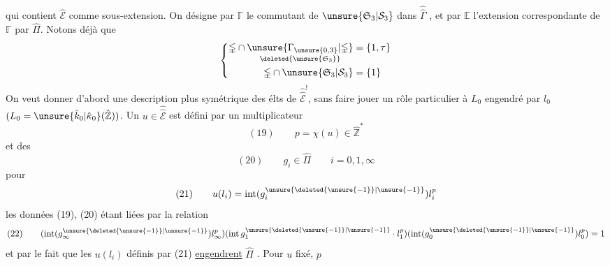 qui contient $\hat{\mathcal E}$ comme sous-extension. On désigne par $\mathbb\Gamma$ le commutant de $\unsure{\mathfrak S_3|\mathcal S_3}$ dans $\widehat{\widehat\Gamma}$ , et par $\mathbb E$ l'extension correspondante de $\mathbb\Gamma$ par $\hat\Pi$. Notons déjà que
\[
\left\{\begin{aligned}
\mathbb\Gamma\cap\underset{\deleted{\unsure{\mathfrak S_3}}}{\unsure{\Gamma_{\unsure{0,3}}|\mathbb\Gamma}}&=\{1,\tau\}\\
\mathbb\Gamma\cap\unsure{\mathfrak S_3|\mathcal S_3}&=\{1\}
\end{aligned}\right.
\]
On veut donner d'abord une description plus symétrique des élts de $\widehat{\widehat{\mathcal E}}^!$, sans faire jouer un rôle particulier à $L_0$ engendré par $l_0$ $(L_0=\unsure{\hat k_0|\hat\kappa_0}(\hat{\mathbb Z}))$. Un $u\in\widehat{\widehat{\mathcal E}}$ est  défini par un multiplicateur
\[
(19)\qquad p=\chi(u)\in\hat{\mathbb Z}^{*}
\]
et des
\[
(20)\qquad g_i\in\hat\Pi\qquad i=0,1,\infty
\]
pour
\[
(21)\qquad u(l_i)=\operatorname{int}(g_i^{\unsure{\deleted{\unsure{-1}}|\unsure{-1}}})l_i^p
\]
les données (19), (20) étant liées par la relation
\[
(22)\qquad(\operatorname{int}(g_\infty^{\unsure{\deleted{\unsure{-1}}|\unsure{-1}}})l_\infty^p)
(\operatorname{int}g_1^{\unsure{\deleted{\unsure{-1}}|\unsure{-1}}}\cdot l_1^p)
(\operatorname{int}(g_0^{\unsure{\deleted{\unsure{-1}}|\unsure{-1}}})l_0^p)=1
\]
et par le fait que les $u(l_i)$ définis par (21) \uline{engendrent} $\hat\Pi$ . Pour $u$ fixé, $p$
